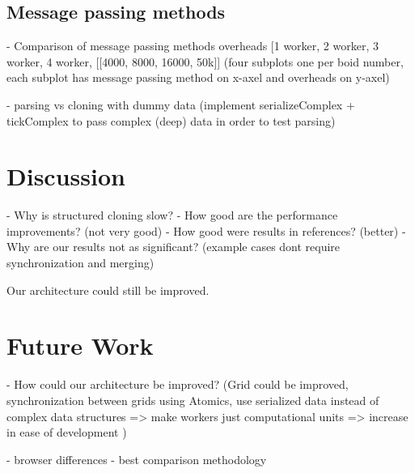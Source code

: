 \documentclass[conference]{IEEEtran}
\begin{document}
\subsection{Message passing methods}
- Comparison of message passing methods overheads [1 worker, 2 worker, 3 worker, 4 worker, [[4000, 8000, 16000, 50k]] (four subplots one per boid number, each subplot has message passing method on x-axel and overheads on y-axel)

- parsing vs cloning with dummy data (implement serializeComplex + tickComplex to pass complex (deep) data in order to test parsing)

\section{Discussion}
\label{sec:disc}

- Why is structured cloning slow?
- How good are the performance improvements? (not very good)
- How good were results in references? (better)
- Why are our results not as significant? (example cases dont require synchronization and merging)


Our architecture could still be improved.




\section{Future Work}
\label{sec:ftr}
- How could our architecture be improved? (Grid could be improved, synchronization between grids using Atomics, use serialized data instead of complex data structures => make workers just computational units => increase in ease of development )

- browser differences
- best comparison methodology

\printbibliography[title={References}]
\end{document}
